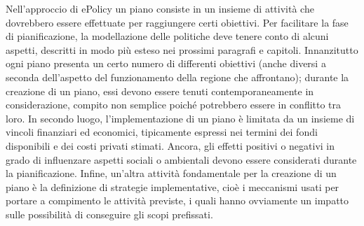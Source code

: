 \documentclass[12pt,a4paper,openright,twoside]{report}
\begin{document}
Nell'approccio di ePolicy un piano consiste in un insieme di attività che dovrebbero essere effettuate per raggiungere certi obiettivi. Per facilitare la fase di pianificazione, la modellazione delle politiche deve tenere conto di alcuni aspetti, descritti in modo più esteso nei prossimi paragrafi e capitoli. Innanzitutto ogni piano presenta un certo numero di differenti obiettivi (anche diversi a seconda dell'aspetto del funzionamento della regione che affrontano); durante la creazione di un piano, essi devono essere tenuti contemporaneamente in considerazione, compito non semplice poiché potrebbero essere in conflitto tra loro. In secondo luogo, l'implementazione di un piano è limitata da un insieme di vincoli finanziari ed economici, tipicamente espressi nei termini dei fondi disponibili e dei costi privati stimati. Ancora, gli effetti positivi o negativi in grado di influenzare aspetti sociali o ambientali devono essere considerati durante la pianificazione. Infine, un'altra attività fondamentale per la creazione di un piano è la definizione di strategie implementative, cioè i meccanismi usati per portare a compimento le attività previste, i quali hanno ovviamente un impatto sulle possibilità di conseguire gli scopi prefissati.
\end{document}
